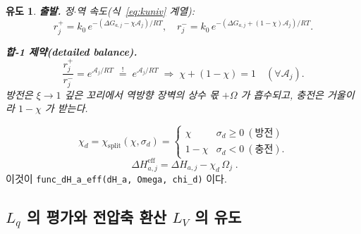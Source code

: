 \documentclass[11pt,a4paper]{article}
\newtheorem*{derivebox}{유도}
\newcommand{\eff}{\mathrm{eff}}
\newcommand{\code}[1]{\texttt{#1}}
\begin{document}
\begin{derivebox}
\textbf{출발.} 정$\cdot$역 속도(식~\eqref{eq:kuniv} 계열):
\begin{equation*}
r_j^+=k_0\,e^{-(\Delta G_{a,j}-\chi\mathcal A_j)/RT},\quad
r_j^-=k_0\,e^{-(\Delta G_{a,j}+(1-\chi)\mathcal A_j)/RT}.
\end{equation*}

\textbf{합-1 제약(detailed balance).}
\begin{equation*}
\frac{r_j^+}{r_j^-}=e^{\mathcal A_j/RT}\;\overset{!}{=}\;e^{\mathcal A_j/RT}
\;\Longrightarrow\;\chi+(1-\chi)=1\quad(\forall\mathcal A_j).
\end{equation*}
방전은 $\xi\to1$ 깊은 꼬리에서 역방향 장벽의 상수 몫 $+\Omega$ 가 흡수되고,
충전은 거울이라 $1-\chi$ 가 받는다.
\end{derivebox}
\begin{equation}
\chi_d=\chi_\mathrm{split}(\chi,\sigma_d)=
\begin{cases}\chi & \sigma_d\ge0\ (\text{방전})\\ 1-\chi & \sigma_d<0\ (\text{충전}).\end{cases}
\label{eq:chid}
\end{equation}
\begin{equation}
\boxed{\;\Delta H_{a,j}^\eff=\Delta H_{a,j}-\chi_d\,\Omega_j\;.}
\label{eq:dHeff}
\end{equation}
이것이 \code{func\_dH\_a\_eff(dH\_a, Omega, chi\_d)} 이다.

\subsection{$L_q$ 의 평가와 전압축 환산 $L_V$ 의 유도}
\end{document}
